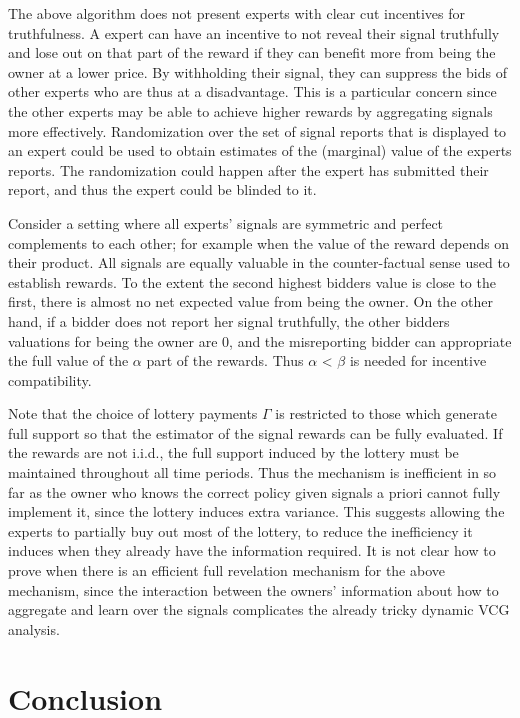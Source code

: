 The above algorithm does not present experts with clear cut incentives for truthfulness.
A expert can have an incentive to not reveal their signal truthfully and lose out on that part of the reward if they can benefit more from being the owner at a lower price.
By withholding their signal, they can suppress the bids of other experts who are thus at a disadvantage. This is a particular concern since the other experts may be able to achieve higher rewards by aggregating signals more effectively.
Randomization over the set of signal reports that is displayed to an expert could be used to obtain estimates of the (marginal) value of the experts reports. The randomization could happen after the expert has submitted their report, and thus the expert could be blinded to it. 

Consider a setting where all experts' signals are symmetric and perfect complements to each other; for example when the value of the reward depends on their product.
All signals are equally valuable in the counter-factual sense used to establish rewards.
To the extent the second highest bidders value is close to the first, there is almost no net expected value from being the owner.
On the other hand, if a bidder does not report her signal truthfully, the other bidders valuations for being the owner are 0, and the misreporting bidder can appropriate the full value of the $\alpha$ part of the rewards.
Thus $\alpha$ < $\beta$ is needed for incentive compatibility. 

Note that the choice of lottery payments $\Gamma$ is restricted to those which generate full support so that the estimator of the signal rewards can be fully evaluated. 
If the rewards are not i.i.d., the full support induced by the lottery must be maintained throughout all time periods. 
Thus the mechanism is inefficient in so far as the owner who knows the correct policy given signals a priori cannot fully implement it, since the lottery induces extra variance.
This suggests allowing the experts to partially buy out most of the lottery, to reduce the inefficiency it induces when they already have the information required. 
It is not clear how to prove when there is an efficient full revelation mechanism for the above mechanism, since the interaction between the owners' information about how to aggregate and learn over the signals complicates the already tricky dynamic VCG analysis. 


\section{Conclusion}

